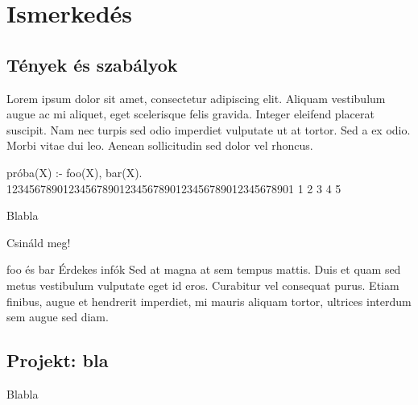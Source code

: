 
\chapter{Ismerkedés}
\section{Tények és szabályok}
 Lorem ipsum dolor sit amet, consectetur
 adipiscing elit. Aliquam vestibulum augue ac mi
 aliquet, eget scelerisque felis gravida. Integer
 eleifend placerat suscipit. Nam nec turpis sed
 odio imperdiet vulputate ut at tortor. Sed a ex
 odio. Morbi vitae dui leo. Aenean sollicitudin
 sed dolor vel rhoncus.

\begin{prolog}
próba(X) :- foo(X), bar(X).
123456789012345678901234567890123456789012345678901
         1         2         3         4         5 
\end{prolog}
Blabla
\begin{problem}
  Csináld meg!
\end{problem}
\begin{infobox}{.75}{foo és bar}
  Érdekes infók Sed at magna at sem tempus
  mattis. Duis et quam sed metus vestibulum
  vulputate eget id eros. Curabitur vel consequat
  purus. Etiam finibus, augue et hendrerit
  imperdiet, mi mauris aliquam tortor, ultrices
  interdum sem augue sed diam.
\end{infobox}
\section{Projekt: bla}
Blabla
